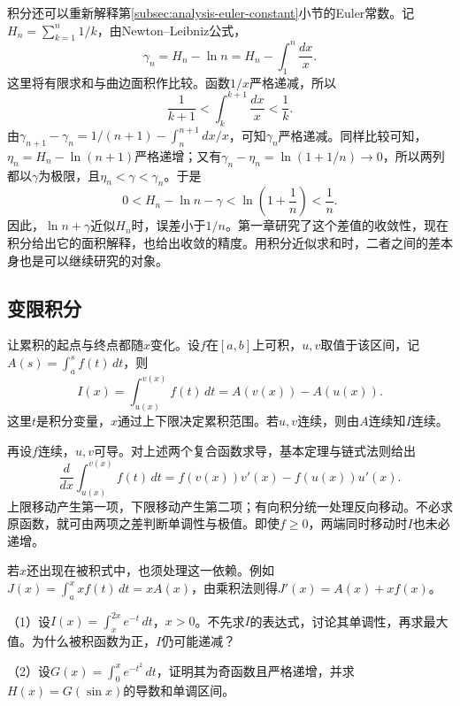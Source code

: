 积分还可以重新解释第\ref{subsec:analysis-euler-constant}小节的Euler常数。记\(H_n=\sum_{k=1}^n1/k\)，由Newton--Leibniz公式，
\begin{equation*}
 \gamma_n=H_n-\ln n=H_n-\int_1^n\frac{dx}{x}.
\end{equation*}
这里将有限求和与曲边面积作比较。函数\(1/x\)严格递减，所以
\begin{equation*}
 \frac1{k+1}<\int_k^{k+1}\frac{dx}{x}<\frac1k.
\end{equation*}
由\(\gamma_{n+1}-\gamma_n=1/(n+1)-\int_n^{n+1}dx/x\)，可知\(\gamma_n\)严格递减。同样比较可知，\(\eta_n=H_n-\ln(n+1)\)严格递增；又有\(\gamma_n-\eta_n=\ln(1+1/n)\to0\)，所以两列都以\(\gamma\)为极限，且\(\eta_n<\gamma<\gamma_n\)。于是
\begin{equation}\label{eq:calculus-euler-constant-error}
 0<H_n-\ln n-\gamma<\ln\left(1+\frac1n\right)<\frac1n.
\end{equation}
因此，\(\ln n+\gamma\)近似\(H_n\)时，误差小于\(1/n\)。第一章研究了这个差值的收敛性，现在积分给出它的面积解释，也给出收敛的精度。用积分近似求和时，二者之间的差本身也是可以继续研究的对象。

\subsection{变限积分}

让累积的起点与终点都随\(x\)变化。设\(f\)在\([a,b]\)上可积，\(u,v\)取值于该区间，记\(A(s)=\int_a^sf(t)\,dt\)，则
\begin{equation*}
 I(x)=\int_{u(x)}^{v(x)}f(t)\,dt=A(v(x))-A(u(x)).
\end{equation*}
这里\(t\)是积分变量，\(x\)通过上下限决定累积范围。若\(u,v\)连续，则由\(A\)连续知\(I\)连续。

再设\(f\)连续，\(u,v\)可导。对上述两个复合函数求导，基本定理与链式法则给出
\begin{equation}\label{eq:calculus-variable-limits}
 \frac d{dx}\int_{u(x)}^{v(x)}f(t)\,dt
 =f(v(x))v'(x)-f(u(x))u'(x).
\end{equation}
上限移动产生第一项，下限移动产生第二项；有向积分统一处理反向移动。不必求原函数，就可由两项之差判断单调性与极值。即使\(f\ge0\)，两端同时移动时\(I\)也未必递增。

若\(x\)还出现在被积式中，也须处理这一依赖。例如\(J(x)=\int_a^x xf(t)\,dt=xA(x)\)，由乘积法则得\(J'(x)=A(x)+xf(x)\)。

\begin{example}
\mbox{}\par\nobreak

（1）设\(I(x)=\int_x^{2x}e^{-t}\,dt\)，\(x>0\)。不先求\(I\)的表达式，讨论其单调性，再求最大值。为什么被积函数为正，\(I\)仍可能递减？

（2）设\(G(x)=\int_0^x e^{-t^2}\,dt\)，证明其为奇函数且严格递增，并求\(H(x)=G(\sin x)\)的导数和单调区间。
\end{example}


